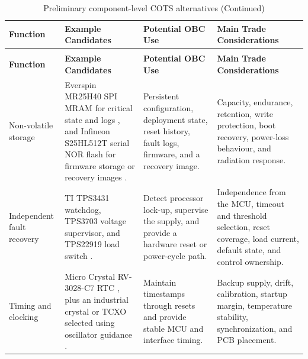 \documentclass[10pt]{../datasheet}
\let\cite\citep
\begin{document}
\renewcommand{\arraystretch}{1.15}
\begin{longtable}{|p{3.0cm}|p{4.6cm}|p{4.8cm}|p{4.1cm}|}
  \caption{Preliminary component-level COTS alternatives} \label{tab:cots_alternatives} \\ \hline
  \textbf{Function}                                                          &
  \textbf{Example Candidates}                                                &
  \textbf{Potential OBC Use}                                                 &
  \textbf{Main Trade Considerations}                                                    \\ \hline
  \endfirsthead
  \caption[]{Preliminary component-level COTS alternatives (Continued)}                 \\ \hline
  \textbf{Function}                                                          &
  \textbf{Example Candidates}                                                &
  \textbf{Potential OBC Use}                                                 &
  \textbf{Main Trade Considerations}                                                    \\ \hline
  \endhead
  \hline
  \endfoot

  Non-volatile storage                                                       &
  Everspin MR25H40 SPI MRAM for critical state and logs
  \cite{everspin_mr25h40}, and Infineon S25HL512T serial NOR flash for
  firmware storage or recovery images \cite{infineon_s25hl512t}.             &
  Persistent configuration, deployment state, reset history, fault logs,
  firmware, and a recovery image.                                            &
  Capacity, endurance, retention, write protection, boot recovery,
  power-loss behaviour, and radiation response.                                         \\ \hline

  Independent fault recovery                                                 &
  TI TPS3431 watchdog, TPS3703 voltage supervisor, and TPS22919 load
  switch \cite{ti_tps3431,ti_tps3703,ti_tps22919}.                           &
  Detect processor lock-up, supervise the supply, and provide a hardware
  reset or power-cycle path.                                                 &
  Independence from the MCU, timeout and threshold selection, reset
  coverage, load current, default state, and control ownership.                         \\ \hline

  Timing and clocking                                                        &
  Micro Crystal RV-3028-C7 RTC \cite{microcrystal_rv3028}, plus an
  industrial crystal or TCXO selected using oscillator guidance
  \cite{st_an2867}.                                                          &
  Maintain timestamps through resets and provide stable MCU and interface
  timing.                                                                    &
  Backup supply, drift, calibration, startup margin, temperature stability,
  synchronization, and PCB placement.                                                   \\ \hline


\end{longtable}
\end{document}
